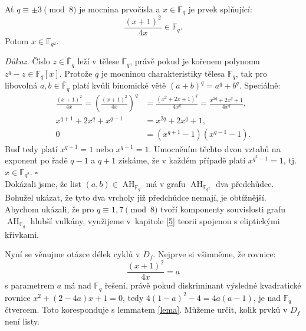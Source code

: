 \documentclass[12pt]{report}
\DeclareMathOperator{\AH}{AH}
\begin{document}
\begin{veta}
Ať $q \equiv \pm 3 \pmod{8}$ je mocnina prvočísla a $x \in \overline{\mathbb{F}_q}$ je prvek splňující:
$$\frac{(x+1)^2}{4x} \in \mathbb{F}_q.$$
Potom $x \in \mathbb{F}_{q^2}$.
\end{veta}
\noindent \textit{Důkaz.} Číslo $z \in \overline{\mathbb{F}}_q$ leží v tělese $\mathbb{F}_q$, právě pokud je kořenem polynomu $z^q - z \in \mathbb{F}_q [x]$. Protože $q$ je mocninou charakteristiky tělesa $\mathbb{F}_q$, tak pro libovolná $a,b \in \overline{\mathbb{F}}_q$ platí kvůli binomické větě $(a+b)^q = a^q + b^q$. Speciálně:
\begin{align*}
\frac{(x+1)^2}{4x} = \left( \frac{(x+1)^{2}}{4 x} \right)^{q} &= \frac{(x^2+2x+1)^{q}}{4 x^q} = \frac{x^{2q}+2 x^q + 1}{4 x^q},\\
x^{q+1} + 2 x^{q} + x^{q-1} &= x^{2q} + 2x^q + 1,\\
0 &= (x^{q+1} - 1)(x^{q-1} - 1).
\end{align*}
Buď tedy platí $x^{q+1} = 1$ nebo $x^{q-1}=1$. Umocněním těchto dvou vztahů na exponent po řadě $q-1$ a $q+1$ získáme, že v každém případě platí $x^{q^2-1}=1$, tj. $x \in \mathbb{F}_{q^2}$. \hfill $\square$\\


Dokázali jsme, že list $(a,b) \in \AH_{\mathbb{F}_q}$ má v grafu $\AH_{\mathbb{F}_{q^2}}$ dva předchůdce. Bohužel ukázat, že tyto dva vrcholy již předchůdce nemají, je obtížnější. Abychom ukázali, že pro $q \equiv 1,7 \pmod{8}$ tvoří komponenty souvislosti grafu $\AH_{\mathbb{F}_q}$ hlubší vulkány, využijeme v~kapitole \ref{5} teorii spojenou s eliptickými křivkami.

Nyní se věnujme otázce délek cyklů v $D_f$. Nejprve si všimněme, že rovnice: $$\frac{(x+1)^2}{4x} = a$$ s parametrem $a$ má nad $\mathbb{F}_q$ řešení, právě pokud diskriminant výsledné kvadratické rovnice $x^2 + (2-4a)x+1=0$, tedy $4(1-a)^2-4 = 4a(a-1)$, je nad $\mathbb{F}_q$ čtvercem. Toto koresponduje s lemmatem \ref{lema}. Můžeme určit, kolik prvků v $D_f$ není listy.



\end{document}
